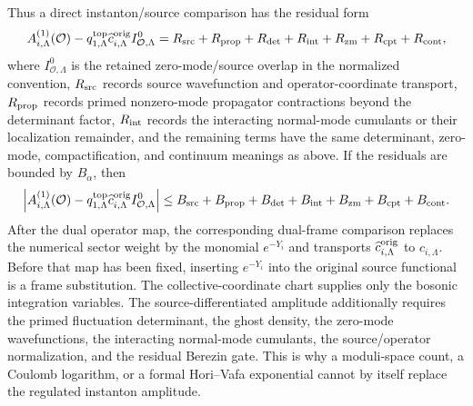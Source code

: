 \begin{controlledapproximation}
Thus a direct instanton/source comparison has the residual form
\begin{equation}
  A^{(1)}_{i,\Lambda}(\mathcal O)
  -
  q^{\rm top}_{1,\Lambda}
  \widehat c^{\rm orig}_{i,\Lambda}I^{0}_{\mathcal O,\Lambda}
  =
  R_{\rm src}+R_{\rm prop}+R_{\rm det}
  +R_{\rm int}+R_{\rm zm}+R_{\rm cpt}+R_{\rm cont},
  \label{eq:glsm-one-vortex-source-amplitude-telescope}
\end{equation}
where \(I^{0}_{\mathcal O,\Lambda}\) is the retained zero-mode/source
overlap in the normalized convention, \(R_{\rm src}\) records source
wavefunction and operator-coordinate transport, \(R_{\rm prop}\) records
primed nonzero-mode propagator contractions beyond the determinant factor,
\(R_{\rm int}\) records the interacting normal-mode cumulants or their
localization remainder, and the remaining terms have the same determinant, zero-mode,
compactification, and continuum meanings as above.  If the residuals are
bounded by \(B_\alpha\), then
\begin{equation}
  \left|
  A^{(1)}_{i,\Lambda}(\mathcal O)
  -
  q^{\rm top}_{1,\Lambda}
  \widehat c^{\rm orig}_{i,\Lambda}I^{0}_{\mathcal O,\Lambda}
  \right|
  \le
  B_{\rm src}+B_{\rm prop}+B_{\rm det}
  +B_{\rm int}+B_{\rm zm}+B_{\rm cpt}+B_{\rm cont}.
  \label{eq:glsm-one-vortex-source-amplitude-bound}
\end{equation}
After the dual operator map, the corresponding dual-frame comparison replaces
the numerical sector weight by the monomial \(e^{-Y_i}\) and transports
\(\widehat c^{\rm orig}_{i,\Lambda}\) to \(c_{i,\Lambda}\).  Before that map has been
fixed, inserting \(e^{-Y_i}\) into the original source functional is a frame
substitution.  The collective-coordinate chart supplies only the bosonic
integration variables.
The source-differentiated amplitude additionally requires the primed
fluctuation determinant, the ghost density, the zero-mode wavefunctions, the
interacting normal-mode cumulants, the source/operator normalization, and the
residual Berezin gate.  This is why a moduli-space count, a Coulomb logarithm,
or a formal Hori--Vafa exponential cannot by itself replace the regulated
instanton amplitude.
\end{controlledapproximation}

